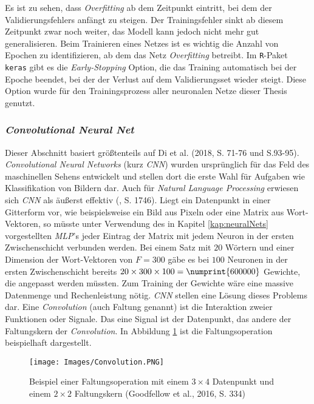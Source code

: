 \documentclass[a4paper,11pt]{article}
\begin{document}
Es ist zu sehen, dass \textit{Overfitting} ab dem Zeitpunkt eintritt, bei dem der Validierungsfehlers anfängt zu steigen. Der Trainingsfehler sinkt ab diesem Zeitpunkt zwar noch weiter, das Modell kann jedoch nicht mehr gut generalisieren. Beim Trainieren eines Netzes ist es wichtig die Anzahl von Epochen zu identifizieren, ab dem das Netz \textit{Overfitting} betreibt. Im \texttt{R}-Paket \texttt{keras} gibt es die \textit{Early-Stopping} Option, die das Training automatisch bei der Epoche beendet, bei der der Verlust auf dem Validierungsset wieder steigt. Diese Option wurde für den Trainingsprozess aller neuronalen Netze dieser Thesis genutzt.


\subsubsection{\textit{Convolutional Neural Net}} \label{kap:CNN}

Dieser Abschnitt basiert größtenteils auf Di et al. (2018, S. 71-76 und S.93-95).\\
\textit{Convolutional Neural Networks} (kurz \textit{CNN}) wurden ursprünglich für das Feld des maschinellen Sehens entwickelt und stellen dort die erste Wahl für Aufgaben wie Klassifikation von Bildern dar. Auch für \textit{Natural Language Processing} erwiesen sich \textit{CNN} als äußerst effektiv (\cite{cnnSentence}, S. 1746). Liegt ein Datenpunkt in einer Gitterform vor, wie beispielsweise ein Bild aus Pixeln oder eine Matrix aus Wort-Vektoren, so müsste unter Verwendung des in Kapitel \ref{kap:neuralNets} vorgestellten \textit{MLP}'s jeder Eintrag der Matrix mit jedem Neuron in der ersten Zwischenschicht verbunden werden. Bei einem Satz mit $20$ Wörtern und einer Dimension der Wort-Vektoren von $F = 300$ gäbe es bei $100$ Neuronen in der ersten Zwischenschicht bereits $20 \times 300 \times 100  = \numprint{600000}$ Gewichte, die angepasst werden müssten. Zum Training der Gewichte wäre eine massive Datenmenge und Rechenleistung nötig. \textit{CNN} stellen eine Lösung dieses Problems dar. Eine \textit{Convolution} (auch Faltung genannt) ist die Interaktion zweier Funktionen oder Signale. Das eine Signal ist der Datenpunkt, das andere der Faltungskern der \textit{Convolution}. In Abbildung \ref{abb:Convolution} ist die Faltungsoperation beispielhaft dargestellt.


\begin{figure}[!ht]
\begin{center}
\texttt{[image: Images/Convolution.PNG]}
\caption{Beispiel einer Faltungsoperation mit einem $3 \times 4$ Datenpunkt und einem $2 \times 2$ Faltungskern (Goodfellow et al., 2016, S. 334)}
\label{abb:Convolution}
\end{center}
\end{figure}
\end{document}
